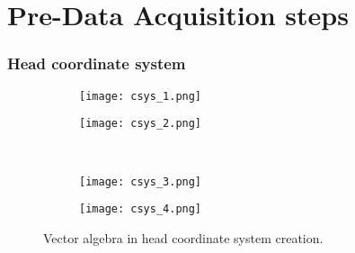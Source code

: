 \section{Pre-Data Acquisition steps}
\begin{frame}
	\frametitle{Head coordinate system}
	\begin{figure}[hbt!]
	\centering
		\begin{subfigure}{0.25\textwidth}
			\texttt{[image: csys\_1.png]}	
		\end{subfigure}
		\begin{subfigure}{0.25\textwidth}
			\texttt{[image: csys\_2.png]}	
		\end{subfigure}
		\\
		\begin{subfigure}{0.25\textwidth}
			\texttt{[image: csys\_3.png]}	
		\end{subfigure}
		\begin{subfigure}{0.25\textwidth}
			\texttt{[image: csys\_4.png]}	
		\end{subfigure}
	\caption{Vector algebra in head coordinate system creation.} 
	\label{fig:BTi_4D_3}
	\end{figure} 
\end{frame}


